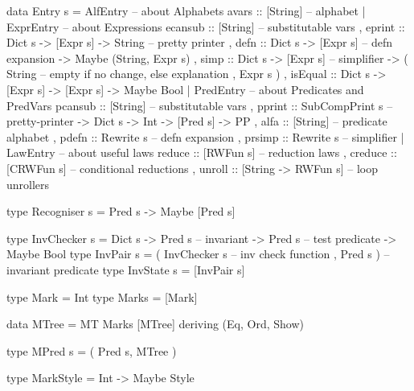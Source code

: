 \begin{code}
data Entry s =
   AlfEntry {   -- about Alphabets
    avars   :: [String]  -- alphabet
   }
 | ExprEntry { -- about Expressions
     ecansub :: [String]                   -- substitutable vars
   , eprint  :: Dict s -> [Expr s] -> String   -- pretty printer
   , defn    :: Dict s -> [Expr s]             -- defn expansion
             -> Maybe (String, Expr s)
   , simp    :: Dict s -> [Expr s]                 -- simplifier
             -> ( String -- empty if no change, else explanation
                , Expr s )
   , isEqual :: Dict s -> [Expr s] -> [Expr s] -> Maybe Bool
   }
 | PredEntry {    -- about Predicates and PredVars
     pcansub :: [String]                   -- substitutable vars
   , pprint  :: SubCompPrint s                 -- pretty-printer
             -> Dict s -> Int -> [Pred s]
             -> PP
   , alfa :: [String]                      -- predicate alphabet
   , pdefn   :: Rewrite s                      -- defn expansion
   , prsimp  :: Rewrite s                          -- simplifier
   }
 | LawEntry {  -- about useful laws
     reduce  :: [RWFun s]            -- reduction laws
   , creduce :: [CRWFun s]           -- conditional reductions
   , unroll  :: [String -> RWFun s]  -- loop unrollers
   }
\end{code}

\begin{code}
type Recogniser s = Pred s -> Maybe [Pred s]
\end{code}

\begin{code}
type InvChecker s
 = Dict s
   -> Pred s     -- invariant
   -> Pred s     -- test predicate
   -> Maybe Bool
type InvPair s
 = ( InvChecker s  -- inv check function
   , Pred s )      -- invariant predicate
type InvState s = [InvPair s]
\end{code}

\newpage
{}

\begin{code}
type Mark = Int
type Marks = [Mark]
\end{code}

\begin{code}
data MTree = MT Marks [MTree] deriving (Eq, Ord, Show)
\end{code}

\begin{code}
type MPred s = ( Pred s, MTree )
\end{code}

\begin{code}
type MarkStyle = Int -> Maybe Style
\end{code}

